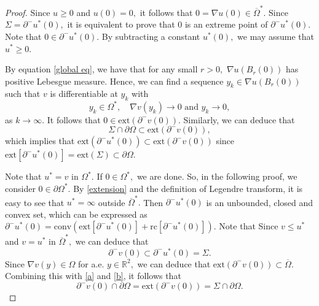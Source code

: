 \documentclass[11pt]{amsart}
\theoremstyle{plain}
\newcommand{\0}{\textbf{0}}
\numberwithin{equation}{section}
\numberwithin{equation}{section}
\numberwithin{figure}{section}
\begin{document}
	\begin{proof}
		Since $u\geq 0$ and $u(0)=0,$ it follows that $0=\nabla u(0)\in \overline{\Omega}^*.$ Since $\Sigma=\partial^{-}u^*(0),$ it is equivalent to prove that $0$ is an extreme point of $\partial^{-} u^{*}(0).$ Note that $0\in \partial^{-}u^*(0).$ By subtracting a constant $u^*(0),$ we may assume that $u^*\geq 0.$
		
		By equation \eqref{global eq}, we have that for any small $r>0,$ $\nabla u(B_{r}(0))$ has positive Lebesgue measure. Hence, we can find a sequence $y_k\in \nabla u(B_{r}(0))$ such that $v$ is differentiable at $y_k$ with
		\begin{equation}\label{limit}
			y_k\in \Omega^*,\quad \nabla v(y_k)\rightarrow 0 \text{ and } y_k\rightarrow 0,
		\end{equation} 
		as $k\rightarrow \infty.$ It follows that $0\in \text{ext}(\partial^{-}v(0)).$ Similarly, we can deduce that
		\begin{equation}\label{a}
			\Sigma\cap \partial \Omega\subset \text{ext}(\partial^{-}v(0)),
		\end{equation}
		which implies that $\text{ext}(\partial^{-} u^{*}(0))\subset \text{ext}(\partial^{-}v(0))$ since $\text{ext} [\partial^{-}u^*(0)]=\text{ext} (\Sigma)\subset \partial \Omega.$
		
		Note that $u^*=v$ in $\Omega^*.$ If $0\in \Omega^*,$ we are done. So, in the following proof, we consider $0\in \partial \Omega^*.$ By \eqref{extension} and the definition of Legendre transform, it is easy to see that $u^*=\infty$ outside $\overline{\Omega}^*.$ Then $\partial^{-}u^*(0)$ is an unbounded, closed and convex set, which can be expressed as $\partial^{-}u^*(0) =\text{conv} (\text{ext}[\partial^{-}u^*(0)] + \text{rc}[\partial^{-}u^*(0)]).$ Note that Since $v\leq u^*$ and $v=u^*$ in $\overline{\Omega}^*,$ we can deduce that
		\begin{equation}\label{b}
			\partial^{-}v(0)\subset \partial^{-} u^{*}(0)=\Sigma.
		\end{equation}
		Since $\nabla v(y)\in \Omega$ for a.e. $ y\in \mathbb{R}^2,$ we can deduce that $\text{ext}(\partial^{-}v(0))\subset \overline{\Omega}.$ Combining this with \eqref{a} and \eqref{b}, it follows that
		\begin{equation}\label{c}
			\partial^{-}v(0)\cap \partial \Omega=\text{ext}(\partial^{-}v(0))=\Sigma\cap \partial \Omega.
		\end{equation}
		

\end{proof}
\end{document}
